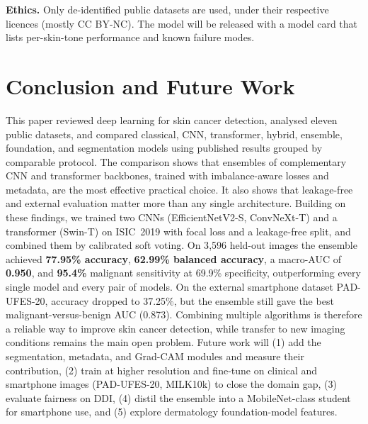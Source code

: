 \textbf{Ethics.} Only de-identified public datasets are used, under
their respective licences (mostly CC BY-NC). The model will be
released with a model card that lists per-skin-tone performance and
known failure modes.

\section{Conclusion and Future Work}\label{sec:conc}
This paper reviewed deep learning for skin cancer detection, analysed
eleven public datasets, and compared classical, CNN, transformer,
hybrid, ensemble, foundation, and segmentation models using published
results grouped by comparable protocol. The comparison shows that
ensembles of complementary CNN and transformer backbones, trained with
imbalance-aware losses and metadata, are the most effective practical
choice. It also shows that leakage-free and external evaluation matter
more than any single architecture. Building on these findings, we
trained two CNNs (EfficientNetV2-S, ConvNeXt-T) and a transformer
(Swin-T) on ISIC~2019 with focal loss and a leakage-free split, and
combined them by calibrated soft voting. On 3{,}596 held-out images the
ensemble achieved \textbf{77.95\% accuracy}, \textbf{62.99\% balanced
accuracy}, a macro-AUC of \textbf{0.950}, and \textbf{95.4\%} malignant
sensitivity at 69.9\% specificity, outperforming every single model and
every pair of models. On the external smartphone dataset PAD-UFES-20,
accuracy dropped to 37.25\%, but the ensemble still gave the best
malignant-versus-benign AUC (0.873). Combining multiple algorithms
is therefore a reliable way to improve skin cancer detection, while
transfer to new imaging conditions remains the main open problem.
Future work will (1) add the segmentation, metadata, and Grad-CAM
modules and measure their contribution, (2) train at higher resolution
and fine-tune on clinical and smartphone images (PAD-UFES-20, MILK10k)
to close the domain gap, (3) evaluate fairness on DDI, (4) distil the
ensemble into a MobileNet-class student for smartphone use, and (5)
explore dermatology foundation-model features.

\ifCLASSOPTIONtwocolumn\balance\fi


